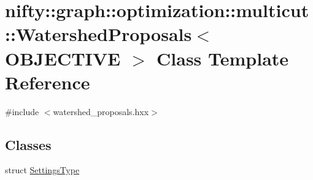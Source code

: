 \hypertarget{classnifty_1_1graph_1_1optimization_1_1multicut_1_1WatershedProposals}{}\section{nifty\+:\+:graph\+:\+:optimization\+:\+:multicut\+:\+:Watershed\+Proposals$<$ O\+B\+J\+E\+C\+T\+I\+V\+E $>$ Class Template Reference}
\label{classnifty_1_1graph_1_1optimization_1_1multicut_1_1WatershedProposals}


{\ttfamily \#include $<$watershed\+\_\+proposals.\+hxx$>$}

\subsection*{Classes}
\begin{DoxyCompactItemize}
\item 
struct \hyperlink{structnifty_1_1graph_1_1optimization_1_1multicut_1_1WatershedProposals_1_1SettingsType}{Settings\+Type}
\end{DoxyCompactItemize}
